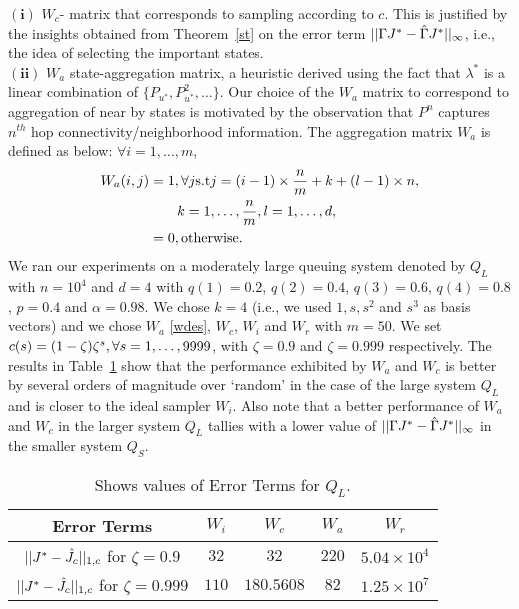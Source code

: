 \documentclass[12pt,draftcls,onecolumn]{IEEEtran}
\begin{document}
{$\mathbf{(i)}$} $W_c$- matrix that corresponds to sampling according to $c$. This is justified by the insights obtained from Theorem~\ref{st} on the error term $||\Gamma J^*-\hat{\Gamma} J^*||_\infty$, i.e., the idea of selecting the important states.\\
{$\mathbf{(ii)}$} $W_a$ state-aggregation matrix, a heuristic derived using the fact that $\lambda^*$ is a linear combination of $\{P_{u^*},P^2_{u^*},\ldots\}$. Our choice of the $W_a$ matrix to correspond to aggregation of near by states is motivated by the observation that $P^n$ captures $n^{th}$ hop connectivity/neighborhood information.
The aggregation matrix $W_a$ is defined as below: $\forall i=1,\ldots,m$,
\begin{align}\label{wdes}
W_a(i,j)&=1, \mb\forall j\mb\text{s.t}\mb j=(i-1)\times\frac{n}{m}+k+(l-1)\times n, \nn\\&\mb\quad\quad k=1,\ldots,\frac{n}{m}, l=1,\ldots,d,\nn\\
&=0,\mb\text{otherwise}.
\end{align}
We ran our experiments on a moderately large queuing system denoted by $Q_L$ with $n=10^4$ and $d=4$ with $q(1)=0.2$, $q(2)=0.4$, $q(3)=0.6$, $q(4)=0.8$, $p=0.4$ and $\alpha=0.98$. We chose $k=4$ (i.e., we used $1, s,s^2$ and $s^3$ as basis vectors) and we chose $W_a$ \eqref{wdes}, $W_c$, $W_i$ and $W_r$ with $m=50$. We set $c(s)=(1-\zeta) \zeta^s, \relax{ }\forall s=1,\ldots,9999$, with $\zeta=0.9$ and $\zeta=0.999$ respectively. The results in Table~\ref{pref} show that the performance exhibited by $W_a$ and $W_c$ is better by several orders of magnitude over `random' in the case of the large system $Q_L$ and is closer to the ideal sampler $W_i$. Also note that a better performance of $W_a$ and $W_c$ in the larger system $Q_L$ tallies with a lower value of $||\Gamma J^*-\hat{\Gamma} J^*||_\infty$ in the smaller system $Q_S$.
\FloatBarrier
\begin{table}[H]
\begin{tabular}{|c|c|c|c|c|}\hline
Error Terms&	$W_i$&	$W_c$& $W_a$& $W_r$ \\\hline
$||J^*-\hat{J}_c||_{1,c}$ for $\zeta=0.9$& $32$&	$32$& $220$& $5.04\times 10^4$ \\\hline
$||J^*-\hat{J}_c||_{1,c}$ for $\zeta=0.999$& $110$&	$180.5608$& $82$& $1.25\times 10^7$ \\\hline
\end{tabular}
\caption{Shows values of Error Terms for $Q_L$.}
\label{pref}
\end{table}
\end{document}
